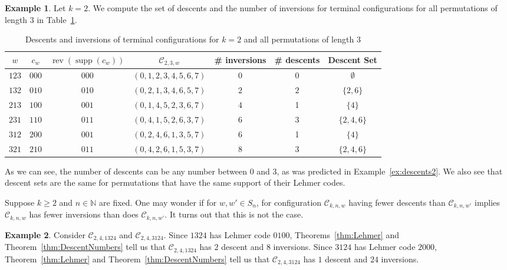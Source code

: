 \documentclass[final]{dmtcs-episciences}
\theoremstyle{definition}
\newtheorem{example}{Example}
\theoremstyle{remark}
\DeclareMathOperator{\supp}{supp}
\DeclareMathOperator{\rev}{rev}
\begin{document}
\begin{example}
    Let $k=2$. We compute the set of descents and the number of inversions for terminal configurations for all permutations of length $3$ in Table~\ref{tab:DecsentsInversions}.
    \begin{table}[htbp]
    \centering
    \begin{tabular}{|c|c|c|c|c|c|c|}
    \hline
        $w$     & $c_w$    & $\rev(\supp(c_w))$ &$\mathcal{C}_{2, 3, w}$ & \# inversions & \# descents   & Descent Set    \\ \hline
        $123$   & $000$    & 000            & $(0,1,2,3,4,5,6,7)$    & 0             & 0    & $\emptyset$  \\ 
        $132$   & $010$    & 010   & $(0,2,1,3,4,6,5,7)$             & $2$           & $2$       & $\{2, 6\}$    \\ 
        $213$   & $100$    & $001$   & $(0,1,4,5,2,3,6,7)$            & $4$           & 1       & $\{4\}$      \\ 
        $231$   & $110$    & $011$  & $(0,4,1,5,2,6,3,7)$     & 6             & 3    & $\{2, 4, 6\}$\\
        $312$   & $200$    & $001$   & $(0,2,4,6,1,3,5,7)$                & 6              & 1    & $\{4\}$    \\ 
        $321$   & $210$    & $011$      & $(0,4,2,6,1,5,3,7)$  & 8            & 3        & $\{2, 4, 6\}$   \\
         \hline 
     \end{tabular}
    \caption{Descents and inversions of terminal configurations for $k=2$ and all permutations of length $3$}
    \label{tab:DecsentsInversions}
\end{table}
As we can see, the number of descents can be any number between 0 and 3, as was predicted in Example~\ref{ex:descents2}. We also see that descent sets are the same for permutations that have the same support of their Lehmer codes.
\end{example}

Suppose $k \geq 2$ and $n \in \mathbb{N}$ are fixed. One may wonder if for $w, w' \in S_n$, for configuration $\mathcal{C}_{k, n, w}$ having fewer descents than $\mathcal{C}_{k, n, w'}$ implies $\mathcal{C}_{k, n, w}$ has fewer inversions than does $\mathcal{C}_{k, n, w'}$. It turns out that this is not the case.
\begin{example}
    Consider $\mathcal{C}_{2, 4, 1324}$ and $\mathcal{C}_{2, 4, 3124}$. Since $1324$ has Lehmer code $0100$, Theorems~\ref{thm:Lehmer} and Theorem~\ref{thm:DescentNumbers} tell us that $\mathcal{C}_{2, 4, 1324}$ has $2$ descent and $8$ inversions. Since $3124$ has Lehmer code $2000$, Theorem~\ref{thm:Lehmer} and Theorem~\ref{thm:DescentNumbers} tell us that $\mathcal{C}_{2, 4, 3124}$ has $1$ descent and $24$ inversions. 
\end{example}
\end{document}
